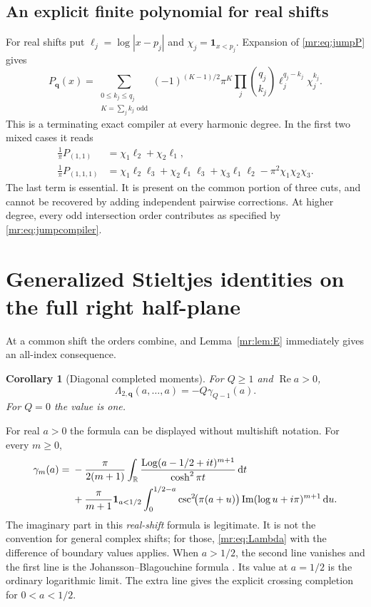 \documentclass[11pt,letterpaper]{article}
\newtheorem{corollary}[theorem]{Corollary}
\theoremstyle{definition}\newtheorem{definition}[theorem]{Definition}
\theoremstyle{remark}\newtheorem{remark}[theorem]{Remark}
\newcommand{\Rea}{\operatorname{Re}}\newcommand{\Ima}{\operatorname{Im}}
\newcommand{\dd}{\,\mathrm d}\newcommand{\M}{\mathcal M}
\begin{document}
\subsection{An explicit finite polynomial for real shifts}
For real shifts put $\ell_j=\log|x-p_j|$ and
$\chi_j=\mathbf1_{x<p_j}$. Expansion of \eqref{mr:eq:jumpP} gives
\begin{equation}\label{mr:eq:jumpcompiler}
 P_{\boldsymbol q}(x)=
 \sum_{\substack{0\le k_j\le q_j\\ K=\sum_jk_j\text{ odd}}}
 (-1)^{(K-1)/2}\pi^K
 \prod_j\binom{q_j}{k_j}\ell_j^{q_j-k_j}\chi_j^{k_j}.
\end{equation}
This is a terminating exact compiler at every harmonic degree.
In the first two mixed cases it reads
\begin{align}
 \frac1\pi P_{(1,1)}&=\chi_1\ell_2+\chi_2\ell_1,\label{mr:eq:pairP}\\
 \frac1\pi P_{(1,1,1)}
 &=\chi_1\ell_2\ell_3+\chi_2\ell_1\ell_3+\chi_3\ell_1\ell_2
   -\pi^2\chi_1\chi_2\chi_3.\label{mr:eq:tripleP}
\end{align}
The last term is essential. It is present on the common portion of
three cuts, and cannot be recovered by adding independent pairwise
corrections. At higher degree, every odd intersection order contributes
as specified by \eqref{mr:eq:jumpcompiler}.

\section{Generalized Stieltjes identities on the full right half-plane}
\label{mr:sec:stieltjes}
At a common shift the orders combine, and
Lemma~\ref{mr:lem:E} immediately gives an all-index consequence.
\begin{corollary}[Diagonal completed moments]\label{mr:cor:diag}
For $Q\ge1$ and $\Rea a>0$,
\begin{equation}\label{mr:eq:diagonal}
 \Lambda_{2,\boldsymbol q}(a,\ldots,a)=-Q\gamma_{Q-1}(a).
\end{equation}
For $Q=0$ the value is one.
\end{corollary}

For real $a>0$ the formula can be displayed without multishift notation.
For every $m\ge0$,
\begin{align}
 \gamma_m(a)={}&-\frac{\pi}{2(m+1)}\int_\R
 \frac{\Log(a-1/2+it)^{m+1}}{\cosh^2\pi t}\dd t\nonumber\\
 &+\frac{\pi}{m+1}\mathbf1_{a<1/2}
 \int_0^{1/2-a}\csc^2\!\bigl(\pi(a+u)\bigr)
       \Ima(\log u+i\pi)^{m+1}\dd u.
 \label{mr:eq:stieltjesall}
\end{align}
The imaginary part in this \emph{real-shift} formula is legitimate.
It is not the convention for general complex shifts; for those,
\eqref{mr:eq:Lambda} with the difference of boundary values applies.
When $a>1/2$, the second line vanishes and the first line is the
Johansson--Blagouchine formula \cite[equation (2)]{JB}. Its value at
$a=1/2$ is the ordinary logarithmic limit. The extra line gives the
explicit crossing completion for $0<a<1/2$.
\end{document}
